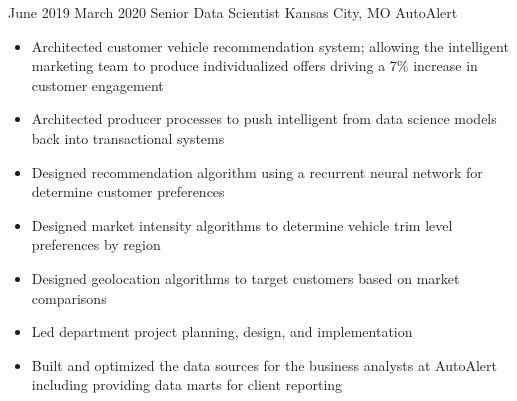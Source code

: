 \Experience
{June 2019}
{March 2020}
{Senior Data Scientist}
{Kansas City, MO}
{AutoAlert}
{
    \begin{itemize}
        \item Architected customer vehicle recommendation system; allowing the
        intelligent marketing team to produce individualized offers driving a
        7\% increase in customer engagement
        \item Architected producer processes to push intelligent from data
        science models back into transactional systems
        \item Designed recommendation algorithm using a recurrent neural network
        for determine customer preferences
        \item Designed market intensity algorithms to determine vehicle trim
        level preferences by region
        \item Designed geolocation algorithms to target customers based on
        market comparisons
        \item Led department project planning, design, and implementation
        \item Built and optimized the data sources for the business analysts at
        AutoAlert including providing data marts for client reporting
    \end{itemize}
}
